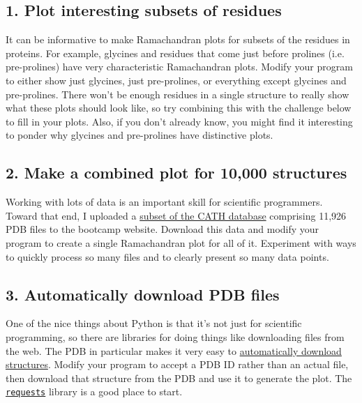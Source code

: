 \documentclass{article}
\newcommand{\module}[2]{\href{#2}{\texttt{#1}}}
\begin{document}
\subsection{1. Plot interesting subsets of residues}

It can be informative to make Ramachandran plots for subsets of the residues in 
proteins.  For example, glycines and residues that come just before prolines 
(i.e. pre-prolines) have very characteristic Ramachandran plots.  Modify your 
program to either show just glycines, just pre-prolines, or everything except 
glycines and pre-prolines.  There won't be enough residues in a single 
structure to really show what these plots should look like, so try combining 
this with the challenge below to fill in your plots.  Also, if you don't 
already know, you might find it interesting to ponder why glycines and 
pre-prolines have distinctive plots.

\subsection{2. Make a combined plot for 10,000 structures}

Working with lots of data is an important skill for scientific programmers.  
Toward that end, I uploaded a 
\href{ftp://ftp.biochem.ucl.ac.uk/pub/cath/v3_5_0/CathDomainPdb.S35.v3.5.0.tgz}{subset 
of the CATH database} comprising 11,926 PDB files to the bootcamp website.  
Download this data and modify your program to create a single Ramachandran plot 
for all of it.  Experiment with ways to quickly process so many files and to 
clearly present so many data points.

\subsection{3. Automatically download PDB files}

One of the nice things about Python is that it's not just for scientific 
programming, so there are libraries for doing things like downloading files 
from the web.  The PDB in particular makes it very easy to 
\href{http://www.rcsb.org/pdb/software/rest.do#search}{automatically download 
structures}.  Modify your program to accept a PDB ID rather than an actual 
file, then download that structure from the PDB and use it to generate the 
plot.  The \module{requests}{http://docs.python-requests.org} library is a good 
place to start.
\end{document}

